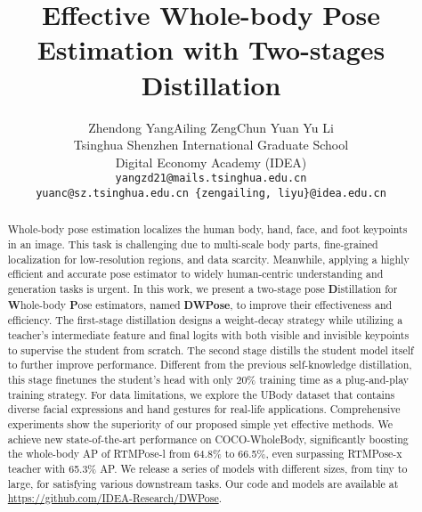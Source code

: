 \documentclass[10pt,twocolumn,letterpaper]{article}
\begin{document}
\title{Effective Whole-body Pose Estimation with Two-stages Distillation}
\author{Zhendong Yang\quad Ailing Zeng\quad Chun Yuan \quad Yu Li\\
Tsinghua Shenzhen International Graduate School\\
\quadInternational Digital Economy Academy (IDEA)\\
{\tt\small yangzd21@mails.tsinghua.edu.cn}\\
{\tt\small yuanc@sz.tsinghua.edu.cn \quad \{zengailing, liyu\}@idea.edu.cn}
}

\maketitle
\ificcvfinal\thispagestyle{empty}\fi

\renewcommand{\thefootnote}{\fnsymbol{footnote}} 

\begin{abstract}

Whole-body pose estimation localizes the human body, hand, face, and foot keypoints in an image. This task is challenging due to multi-scale body parts, fine-grained localization for low-resolution regions, and data scarcity. Meanwhile, applying a highly efficient and accurate pose estimator to widely human-centric understanding and generation tasks is urgent. In this work, we present a two-stage pose \textbf{D}istillation for \textbf{W}hole-body \textbf{P}ose estimators, named \textbf{DWPose}, to improve their effectiveness and efficiency. The first-stage distillation designs a weight-decay strategy while utilizing a teacher's intermediate feature and final logits with both visible and invisible keypoints to supervise the student from scratch. The second stage distills the student model itself to further improve performance. Different from the previous self-knowledge distillation, this stage finetunes the student's head with only 20\% training time as a plug-and-play training strategy. For data limitations, we explore the UBody dataset that contains diverse facial expressions and hand gestures for real-life applications. Comprehensive experiments show the superiority of our proposed simple yet effective methods. We achieve new state-of-the-art performance on COCO-WholeBody, significantly boosting the whole-body AP of RTMPose-l from 64.8\% to 66.5\%, even surpassing RTMPose-x teacher with 65.3\% AP. We release a series of models with different sizes, from tiny to large, for satisfying various downstream tasks. Our code and models are available at \url{https://github.com/IDEA-Research/DWPose}.

\end{abstract}
\end{document}
